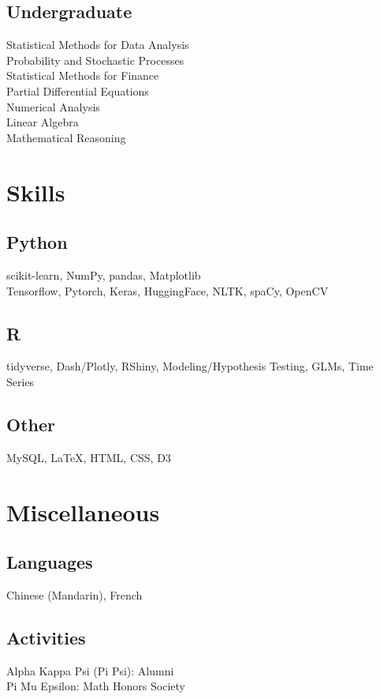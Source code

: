 \documentclass[]{deedy-resume-openfont}
\begin{document}
\begin{minipage}[t]{0.33\textwidth}
\subsection{Undergraduate} 
Statistical Methods for Data Analysis \\
Probability and Stochastic Processes \\
Statistical Methods for Finance \\
Partial Differential Equations \\
Numerical Analysis \\
Linear Algebra \\
Mathematical Reasoning \\
\sectionsep





\section{Skills}
\subsection{Python}
scikit-learn, NumPy, pandas, Matplotlib \\
Tensorflow, Pytorch, Keras, HuggingFace, NLTK, spaCy, OpenCV \\
\subsection{R}
tidyverse, Dash/Plotly, RShiny, Modeling/Hypothesis Testing,
GLMs, Time Series
\subsection{Other}
MySQL, \LaTeX, HTML, CSS, D3
\sectionsep

\section{Miscellaneous}
\subsection{Languages}
Chinese (Mandarin), French
\subsection{Activities}
Alpha Kappa Psi (Pi Psi): Alumni \\
Pi Mu Epsilon: Math Honors Society
\sectionsep

%
%

\end{minipage} 
\end{document}
